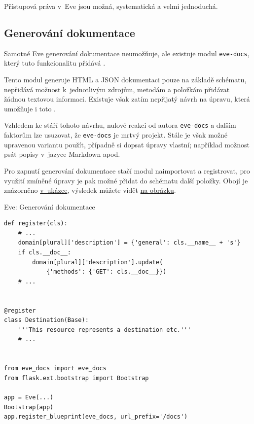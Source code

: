 Přístupová práva v~Eve jsou možná, systematická a velmi jednoduchá.

\subsection{Generování dokumentace}\label{generovuxe1nuxed-dokumentace}

Samotné Eve generování dokumentace neumožňuje, ale existuje modul \verb!eve-docs!, který tuto funkcionalitu přidává \autocite{evedocs}.

Tento modul generuje HTML a JSON dokumentaci pouze na základě schématu, nepřidává možnost k~jednotlivým zdrojům, metodám a položkám přidávat žádnou textovou informaci. Existuje však zatím nepřijatý návrh na úpravu, která umožňuje i toto \autocite{evedocspr}.

Vzhledem ke stáří tohoto návrhu, nulové reakci od autora \verb!eve-docs! a dalším faktorům lze usuzovat, že \verb!eve-docs! je mrtvý projekt. Stále je však možné upravenou variantu použít, případně si dopsat úpravy vlastní; například možnost psát popisy v~jazyce Markdown apod.

Pro zapnutí generování dokumentace stačí modul naimportovat a registrovat, pro využití zmíněné úpravy je pak možné přidat do schématu další položky. Obojí je znázorněno \protect\hyperlink{code:eve:docs}{v~ukázce}, výsledek můžete vidět \protect\hyperlink{pic:eve-docs}{na obrázku}.

\begin{listing}[htbp]
\caption{{\label{code:eve:docs}Eve: Generování dokumentace}}
\begin{verbatim}
def register(cls):
    # ...
    domain[plural]['description'] = {'general': cls.__name__ + 's'}
    if cls.__doc__:
        domain[plural]['description'].update(
            {'methods': {'GET': cls.__doc__}})
    # ...


@register
class Destination(Base):
    '''This resource represents a destination etc.'''
    # ...


from eve_docs import eve_docs
from flask.ext.bootstrap import Bootstrap

app = Eve(...)
Bootstrap(app)
app.register_blueprint(eve_docs, url_prefix='/docs')
\end{verbatim}
\end{listing}


